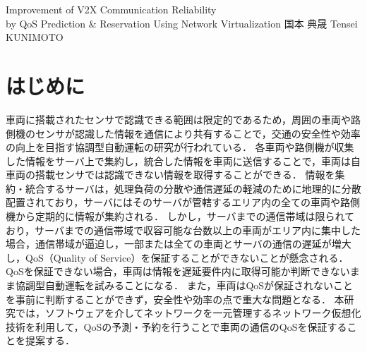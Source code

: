 \documentclass[a4paper,10pt,twocolumn,uplatex]{jsarticle}
\date{20}
\begin{document}
{Improvement of V2X Communication Reliability\\by QoS Prediction \& Reservation Using Network Virtualization}
{国本 典晟}
{Tensei KUNIMOTO}

\section{はじめに}
車両に搭載されたセンサで認識できる範囲は限定的であるため，周囲の車両や路側機のセンサが認識した情報を通信により共有することで，交通の安全性や効率の向上を目指す協調型自動運転の研究が行われている\cite{Cooperative}．
各車両や路側機が収集した情報をサーバ上で集約し，統合した情報を車両に送信することで，車両は自車両の搭載センサでは認識できない情報を取得することができる．
情報を集約・統合するサーバは，処理負荷の分散や通信遅延の軽減のために地理的に分散配置されており\cite{MEC}，サーバにはそのサーバが管轄するエリア内の全ての車両や路側機から定期的に情報が集約される．
しかし，サーバまでの通信帯域は限られており，サーバまでの通信帯域で収容可能な台数以上の車両がエリア内に集中した場合，通信帯域が逼迫し，一部または全ての車両とサーバの通信の遅延が増大し，QoS（Quality of Service）を保証することができないことが懸念される\cite{QoS}．
QoSを保証できない場合，車両は情報を遅延要件内に取得可能か判断できないまま協調型自動運転を試みることになる．
また，車両はQoSが保証されないことを事前に判断することができず，安全性や効率の点で重大な問題となる．
本研究では，ソフトウェアを介してネットワークを一元管理するネットワーク仮想化技術を利用して，QoSの予測・予約を行うことで車両の通信のQoSを保証することを提案する．
\end{document}
